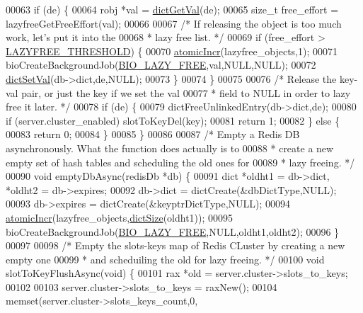 \begin{DoxyCode}
00063     \textcolor{keywordflow}{if} (de) \{
00064         robj *val = \hyperlink{dict_8h_ae8d2cc391873b2bea2b87c4f80f43120}{dictGetVal}(de);
00065         size\_t free\_effort = lazyfreeGetFreeEffort(val);
00066 
00067         \textcolor{comment}{/* If releasing the object is too much work, let's put it into the}
00068 \textcolor{comment}{         * lazy free list. */}
00069         \textcolor{keywordflow}{if} (free\_effort > \hyperlink{lazyfree_8c_a16c7a657b0fbf79b2e92306f347c4512}{LAZYFREE\_THRESHOLD}) \{
00070             \hyperlink{atomicvar_8h_acb57163a8c3d3c29f38ad239ef0a9c2d}{atomicIncr}(lazyfree\_objects,1);
00071             bioCreateBackgroundJob(\hyperlink{bio_8h_afdc82658b2e29c63afcdb2e808b8a510}{BIO\_LAZY\_FREE},val,NULL,NULL);
00072             \hyperlink{dict_8h_a95cae6581aca3a7a4c5e226e565294c9}{dictSetVal}(db->dict,de,NULL);
00073         \}
00074     \}
00075 
00076     \textcolor{comment}{/* Release the key-val pair, or just the key if we set the val}
00077 \textcolor{comment}{     * field to NULL in order to lazy free it later. */}
00078     \textcolor{keywordflow}{if} (de) \{
00079         dictFreeUnlinkedEntry(db->dict,de);
00080         \textcolor{keywordflow}{if} (server.cluster\_enabled) slotToKeyDel(key);
00081         \textcolor{keywordflow}{return} 1;
00082     \} \textcolor{keywordflow}{else} \{
00083         \textcolor{keywordflow}{return} 0;
00084     \}
00085 \}
00086 
00087 \textcolor{comment}{/* Empty a Redis DB asynchronously. What the function does actually is to}
00088 \textcolor{comment}{ * create a new empty set of hash tables and scheduling the old ones for}
00089 \textcolor{comment}{ * lazy freeing. */}
00090 \textcolor{keywordtype}{void} emptyDbAsync(redisDb *db) \{
00091     dict *oldht1 = db->dict, *oldht2 = db->expires;
00092     db->dict = dictCreate(&dbDictType,NULL);
00093     db->expires = dictCreate(&keyptrDictType,NULL);
00094     \hyperlink{atomicvar_8h_acb57163a8c3d3c29f38ad239ef0a9c2d}{atomicIncr}(lazyfree\_objects,\hyperlink{dict_8h_af193430dd3d5579a52b194512f72c1f0}{dictSize}(oldht1));
00095     bioCreateBackgroundJob(\hyperlink{bio_8h_afdc82658b2e29c63afcdb2e808b8a510}{BIO\_LAZY\_FREE},NULL,oldht1,oldht2);
00096 \}
00097 
00098 \textcolor{comment}{/* Empty the slots-keys map of Redis CLuster by creating a new empty one}
00099 \textcolor{comment}{ * and scheduiling the old for lazy freeing. */}
00100 \textcolor{keywordtype}{void} slotToKeyFlushAsync(\textcolor{keywordtype}{void}) \{
00101     rax *old = server.cluster->slots\_to\_keys;
00102 
00103     server.cluster->slots\_to\_keys = raxNew();
00104     memset(server.cluster->slots\_keys\_count,0,

\end{DoxyCode}
